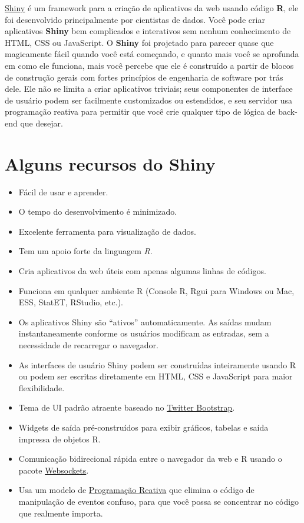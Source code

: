 \documentclass[
]{book}
\begin{document}
\href{https://shiny.rstudio.com/}{Shiny} é um framework para a criação de aplicativos da web usando código \textbf{R}, ele foi desenvolvido principalmente por cientistas de dados. Você pode criar aplicativos \textbf{Shiny} bem complicados e interativos sem nenhum conhecimento de HTML, CSS ou JavaScript. O \textbf{Shiny} foi projetado para parecer quase que magicamente fácil quando você está começando, e quanto mais você se aprofunda em como ele funciona, mais você percebe que ele é construído a partir de blocos de construção gerais com fortes princípios de engenharia de software por trás dele. Ele não se limita a criar aplicativos triviais; seus componentes de interface de usuário podem ser facilmente customizados ou estendidos, e seu servidor usa programação reativa para permitir que você crie qualquer tipo de lógica de back-end que desejar.

\hypertarget{alguns-recursos-do-shiny}{%
\section{\texorpdfstring{\textbf{Alguns recursos do Shiny}}{Alguns recursos do Shiny}}\label{alguns-recursos-do-shiny}}

\begin{itemize}
\item
  Fácil de usar e aprender.
\item
  O tempo do desenvolvimento é minimizado.
\item
  Excelente ferramenta para visualização de dados.
\item
  Tem um apoio forte da linguagem \emph{R}.
\item
  Cria aplicativos da web úteis com apenas algumas linhas de códigos.
\item
  Funciona em qualquer ambiente R (Console R, Rgui para Windows ou Mac, ESS, StatET, RStudio, etc.).
\item
  Os aplicativos Shiny são ``ativos'' automaticamente. As saídas mudam instantaneamente conforme os usuários modificam as entradas, sem a necessidade de recarregar o navegador.
\item
  As interfaces de usuário Shiny podem ser construídas inteiramente usando R ou podem ser escritas diretamente em HTML, CSS e JavaScript para maior flexibilidade.
\item
  Tema de UI padrão atraente baseado no \href{https://getbootstrap.com/2.0.2/}{Twitter Bootstrap}.
\item
  Widgets de saída pré-construídos para exibir gráficos, tabelas e saída impressa de objetos R.
\item
  Comunicação bidirecional rápida entre o navegador da web e R usando o pacote \href{http://illposed.net/websockets.html}{Websockets}.
\item
  Usa um modelo de \href{https://en.wikipedia.org/wiki/Reactive_programming}{Programação Reativa} que elimina o código de manipulação de eventos confuso, para que você possa se concentrar no código que realmente importa.
\end{itemize}
\end{document}
